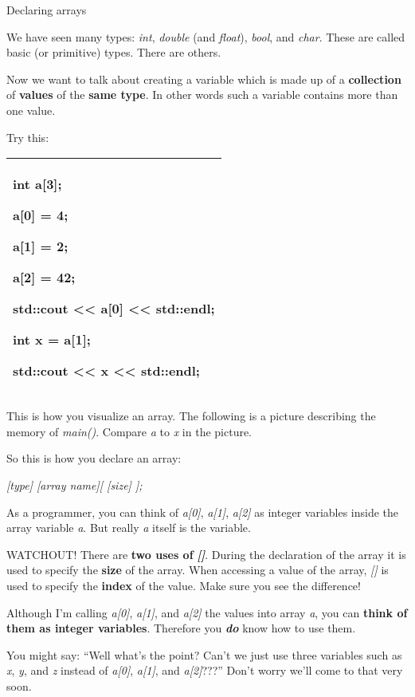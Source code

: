 \documentclass[
]{article}
\begin{document}
Declaring arrays

We have seen many types: \emph{int}, \emph{double} (and \emph{float}),
\emph{bool}, and \emph{char}. These are called basic (or primitive)
types. There are others.

Now we want to talk about creating a variable which is made up of a
\textbf{collection} of \textbf{values} of the \textbf{same type}. In
other words such a variable contains more than one value.

Try this:

\begin{longtable}[]{@{}l@{}}
\toprule
\endhead
\begin{minipage}[t]{0.97\columnwidth}\raggedright
int a{[}3{]};

a{[}0{]} = 4;

a{[}1{]} = 2;

a{[}2{]} = 42;

std::cout \textless\textless{} a{[}0{]} \textless\textless{} std::endl;

int x = a{[}1{]};

std::cout \textless\textless{} x \textless\textless{} std::endl; \strut
\end{minipage}\tabularnewline
\bottomrule
\end{longtable}

This is how you visualize an array. The following is a picture
describing the memory of \emph{main()}. Compare \emph{a} to \emph{x} in
the picture.

So this is how you declare an array:

\emph{ {[}type{]} {[}array name{]}{[} {[}size{]} {]};}

As a programmer, you can think of \emph{a{[}0{]}}, \emph{a{[}1{]}},
\emph{a{[}2{]}} as integer variables inside the array variable \emph{a}.
But really \emph{a} itself is the variable.

WATCHOUT! There are \textbf{two uses of }\emph{\textbf{{[}{]}}}. During
the declaration of the array it is used to specify the \textbf{size} of
the array. When accessing a value of the array, \emph{{[}{]}} is used to
specify the \textbf{index} of the value. Make sure you see the
difference!

Although I'm calling \emph{a{[}0{]}}, \emph{a{[}1{]}}, and
\emph{a{[}2{]}} the values into array \emph{a}, you can \textbf{think of
them as integer variables}. Therefore you \emph{\textbf{do}} know how to
use them.

You might say: ``Well what's the point? Can't we just use three
variables such as \emph{x}, \emph{y}, and \emph{z} instead of
\emph{a{[}0{]}}, \emph{a{[}1{]}}, and \emph{a{[}2{]}}???'' Don't worry
we'll come to that very soon.
\end{document}
